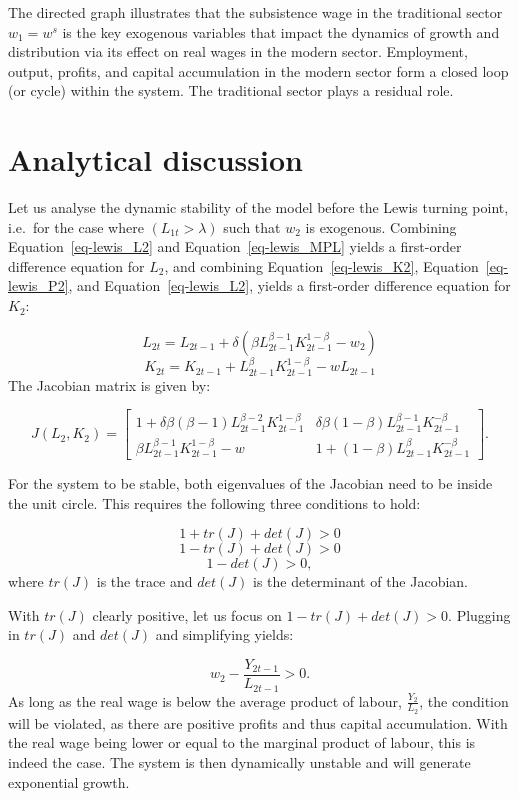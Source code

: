 \documentclass[
  letterpaper,
  DIV=11,
  numbers=noendperiod]{scrreprt}
\begin{document}
The directed graph illustrates that the subsistence wage in the
traditional sector \(w_1=w^s\) is the key exogenous variables that
impact the dynamics of growth and distribution via its effect on real
wages in the modern sector. Employment, output, profits, and capital
accumulation in the modern sector form a closed loop (or cycle) within
the system. The traditional sector plays a residual role.

\section{Analytical discussion}\label{analytical-discussion-10}

Let us analyse the dynamic stability of the model before the Lewis
turning point, i.e.~for the case where \((L_{1t}>\lambda)\) such that
\(w_2\) is exogenous. Combining Equation~\ref{eq-lewis_L2} and
Equation~\ref{eq-lewis_MPL} yields a first-order difference equation for
\(L_2\), and combining Equation~\ref{eq-lewis_K2},
Equation~\ref{eq-lewis_P2}, and Equation~\ref{eq-lewis_L2}, yields a
first-order difference equation for \(K_2\):

\[
L_{2t}= L_{2t-1} + \delta(\beta L_{2t-1}^{\beta -1}K_{2t-1}^{1-\beta} - w_{2})
\] \[
K_{2t}=K_{2t-1} + L_{2t-1}^\beta K_{2t-1}^{1-\beta} - wL_{2t-1}
\] The Jacobian matrix is given by:

\[
J(L_2, K_2)=\begin{bmatrix} 1+ \delta\beta (\beta-1) L_{2t-1}^{\beta-2} K_{2t-1}^{1-\beta}   &\delta\beta (1-\beta) L_{2t-1}^{\beta-1} K_{2t-1}^{-\beta} \\ \beta L_{2t-1}^{\beta-1} K_{2t-1}^{1-\beta} -w & 1+ (1-\beta) L_{2t-1}^{\beta} K_{2t-1}^{-\beta} \end{bmatrix}.
\]

For the system to be stable, both eigenvalues of the Jacobian need to be
inside the unit circle. This requires the following three conditions to
hold:

\[
1+tr(J)+det(J)>0
\] \[
1-tr(J)+det(J)>0
\] \[
1-det(J)>0,
\] where \(tr(J)\) is the trace and \(det(J)\) is the determinant of the
Jacobian.

With \(tr(J)\) clearly positive, let us focus on \(1-tr(J)+det(J)>0\).
Plugging in \(tr(J)\) and \(det(J)\) and simplifying yields:

\[
w_2 - \frac{Y_{2t-1}}{L_{2t-1}}>0.
\] As long as the real wage is below the average product of labour,
\(\frac{Y_{2}}{L_{2}}\), the condition will be violated, as there are
positive profits and thus capital accumulation. With the real wage being
lower or equal to the marginal product of labour, this is indeed the
case. The system is then dynamically unstable and will generate
exponential growth.
\end{document}
